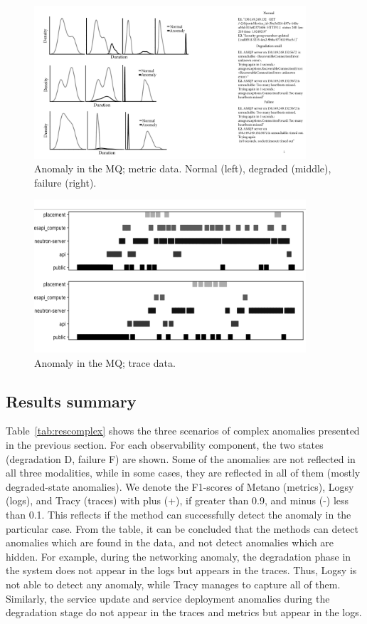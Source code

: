 \begin{figure}[!t]
\centerline{\includegraphics[width=0.9\textwidth]{gfx/chap7/servicefailiuremetrics.pdf}}
\caption{Anomaly in the MQ; metric data. Normal (left), degraded (middle), failure (right).}
\label{fig:service:metric}
\end{figure}

\begin{figure}[!t]
\centerline{\includegraphics[width=0.9\textwidth]{gfx/chap7/servicefailiuretraces.pdf}}
\caption{Anomaly in the MQ; trace data.}
\label{fig:service:trace}
\end{figure}

\newpage

\subsection{Results summary}
Table~\ref{tab:rescomplex} shows the three scenarios of complex anomalies presented in the previous section. For each observability component, the two states (degradation D, failure F) are shown. Some of the anomalies are not reflected in all three modalities, while in some cases, they are reflected in all of them (mostly degraded-state anomalies). We denote the F1-scores of Metano (metrics), Logsy (logs), and Tracy (traces) with plus (+), if greater than 0.9, and minus (-) less than 0.1. This reflects if the method can successfully detect the anomaly in the particular case. From the table, it can be concluded that the methods can detect anomalies which are found in the data, and not detect anomalies which are hidden. For example, during the networking anomaly, the degradation phase in the system does not appear in the logs but appears in the traces. Thus, Logsy is not able to detect any anomaly, while Tracy manages to capture all of them. Similarly, the service update and service deployment anomalies during the degradation stage do not appear in the traces and metrics but appear in the logs.

